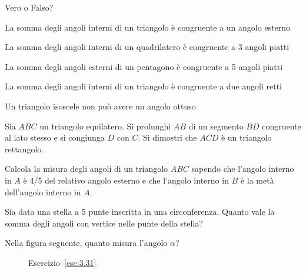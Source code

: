 \begin{esercizio}
\label{ese:3.47}
Vero o Falso?
\begin{enumeratea}
\item La somma degli angoli interni di un triangolo è congruente a un 
angolo esterno\tab\tab\hfill\boxV\quad\boxF
\item La somma degli angoli interni di un quadrilatero è congruente a 
3 angoli piatti\tab\tab\hfill\boxV\quad\boxF
\item La somma degli angoli esterni di un pentagono è congruente a 5 
angoli piatti\hfill\boxV\quad\boxF
\item La somma degli angoli interni di un triangolo è congruente a 
due angoli retti\hfill\boxV\quad\boxF
\item Un triangolo isoscele non può avere un angolo 
ottuso\hfill\boxV\quad\boxF
\end{enumeratea}
\end{esercizio}

\begin{esercizio}
\label{ese:3.48}
Sia \(ABC\) un triangolo equilatero. Si prolunghi \(AB\) di un segmento 
\(BD\) congruente al lato stesso e si congiunga \(D\) con \(C\). Si 
dimostri che \(ACD\) è un triangolo rettangolo.
\end{esercizio}

\begin{esercizio}
\label{ese:3.49}
Calcola la misura degli angoli di un triangolo \(ABC\) sapendo che 
l'angolo interno in \(A\) è \(4/5\) del relativo angolo esterno e che 
l'angolo interno in \(B\) è la metà dell'angolo interno in \(A\).
\end{esercizio}

\begin{esercizio}
\label{ese:3.50}
Sia data una stella a 5 punte inscritta in una circonferenza. Quanto 
vale la somma degli angoli con vertice nelle punte della stella? 
\end{esercizio}

\begin{esercizio}
\label{ese:3.51}
Nella figura seguente, quanto misura l'angolo \(\alpha\)?  
\end{esercizio}

\begin{inaccessibleblock}
 \begin{figure}[htb]
\centering
\caption{Esercizio~\ref{ese:3.31}}\label{fig:ese3.51}
\end{figure}
\end{inaccessibleblock}

